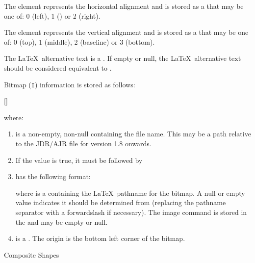 \begin{numbered}
\begin{enumerate}
  The  element represents the horizontal alignment and
  is stored as a  that may be one of: 0 (left), 1
  () or 2 (right).

  The  element represents the vertical alignment and
  is stored as a  that may be one of: 0 (top), 1
  (middle), 2 (baseline) or 3 (bottom).

  The \LaTeX\ alternative text  is a .
  If empty or null, the \LaTeX\ alternative text should be considered equivalent
  to .
  \end{enumerate}%

\item\label{jdr:bitmap} Bitmap (\texttt{I}) information is stored as follows:
\begin{syntaxline}
  []
\end{syntaxline}
where:
  \begin{enumerate}
  \item {} is a non-empty, non-null 
  containing the file name. This may be a path relative to the
  \gls{JDR}\slash\gls{AJR} file for version 1.8 onwards.

  \item If the  value  is true, it must
  be followed by 

  \item\label{jdr:latexbitmap}
   has the following format:
  \begin{syntaxline}
  \end{syntaxline}
  where  is a  containing the \LaTeX\
  pathname for the bitmap. A null or empty value indicates it should
  be determined from \meta{filename} (replacing the pathname
  separator with a \gls{forwardslash} if necessary). The image command is stored
  in the \type{string} \meta{imgcmd} and may be empty or null.

  \item {} is a . The origin
  is the bottom left corner of the \gls{bitmap}.
  \end{enumerate}%

\item \label{jdr:composite}Composite Shapes


\end{numbered}
